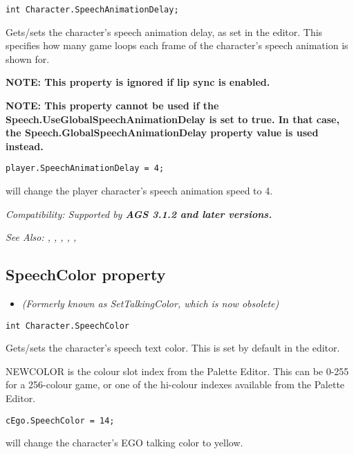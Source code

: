 \begin{verbatim}
int Character.SpeechAnimationDelay;
\end{verbatim}

Gets/sets the character's speech animation delay, as set in the editor. This specifies
how many game loops each frame of the character's speech animation is shown for.

\bf{NOTE:} This property is ignored if lip sync is enabled.

\bf{NOTE:} This property \bf{cannot} be used if the Speech.UseGlobalSpeechAnimationDelay is set to \bf{true}.
In that case, the Speech.GlobalSpeechAnimationDelay property value is used instead.

\begin{verbatim}
player.SpeechAnimationDelay = 4;
\end{verbatim}
will change the player character's speech animation speed to 4.

\it{Compatibility:} Supported by \bf{AGS 3.1.2} and later versions.

\it{See Also:} ,
,
,
,
,


\subsection{SpeechColor property}\label{Character.SpeechColor}%

\begin{itemize}
\item \it{(Formerly known as SetTalkingColor, which is now obsolete)}
\end{itemize}

\begin{verbatim}
int Character.SpeechColor
\end{verbatim}
Gets/sets the character's speech text color. This is set by default in the
editor.

NEWCOLOR is the colour slot index from the Palette Editor. This can be 0-255 for
a 256-colour game, or one of the hi-colour indexes available from the Palette Editor.

\begin{verbatim}
cEgo.SpeechColor = 14;
\end{verbatim}
will change the character's EGO talking color to yellow.

